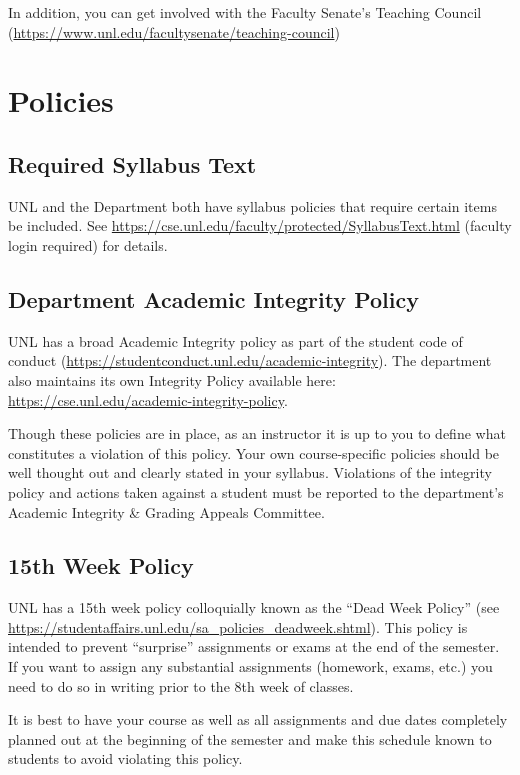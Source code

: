 \documentclass[12pt]{scrartcl}
\begin{document}
In addition, you can get involved with the Faculty Senate's
Teaching Council (\url{https://www.unl.edu/facultysenate/teaching-council})

\section{Policies}

\subsection{Required Syllabus Text}

UNL and the Department both have syllabus policies that require
certain items be included.  See 
\url{https://cse.unl.edu/faculty/protected/SyllabusText.html} (faculty login required) for details.

\subsection{Department Academic Integrity Policy}

UNL has a broad Academic Integrity policy as part of the
student code of conduct (\url{https://studentconduct.unl.edu/academic-integrity}).  The department also maintains its own Integrity
Policy available here: \url{https://cse.unl.edu/academic-integrity-policy}.

Though these policies are in place, as an instructor it is up
to you to define what constitutes a violation of this policy.
Your own course-specific policies should be well thought out and
clearly stated in your syllabus.  Violations of the integrity
policy and actions taken against a student must be reported to
the department's Academic Integrity \& Grading Appeals Committee.

\subsection{15th Week Policy}

UNL has a 15th week policy colloquially known as the ``Dead Week
Policy'' (see \url{https://studentaffairs.unl.edu/sa_policies_deadweek.shtml}).  This policy is intended to prevent
``surprise'' assignments or exams at the end of the semester.
If you want to assign any substantial assignments (homework, 
exams, etc.) you need to do so in writing prior to the 8th week
of classes.  

It is best to have your course as well as all assignments and
due dates completely planned out at the beginning of the semester
and make this schedule known to students to avoid violating this
policy.  
\end{document}
